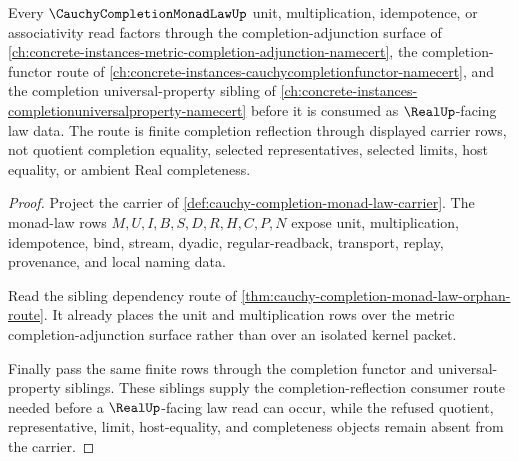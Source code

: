 \begin{theorem}
\label{thm:cauchy-completion-monad-law-completion-reflection-consumer-link}
Every $\CauchyCompletionMonadLawUp$ unit, multiplication, idempotence, or associativity read factors through the completion-adjunction surface of \autoref{ch:concrete-instances-metric-completion-adjunction-namecert}, the completion-functor route of \autoref{ch:concrete-instances-cauchycompletionfunctor-namecert}, and the completion universal-property sibling of \autoref{ch:concrete-instances-completionuniversalproperty-namecert} before it is consumed as $\RealUp$-facing law data. The route is finite completion reflection through displayed carrier rows, not quotient completion equality, selected representatives, selected limits, host equality, or ambient Real completeness.
\end{theorem}
\begin{proof}
Project the carrier of \autoref{def:cauchy-completion-monad-law-carrier}. The monad-law rows $M,U,I,B,S,D,R,H,C,P,N$ expose unit, multiplication, idempotence, bind, stream, dyadic, regular-readback, transport, replay, provenance, and local naming data.

Read the sibling dependency route of \autoref{thm:cauchy-completion-monad-law-orphan-route}. It already places the unit and multiplication rows over the metric completion-adjunction surface rather than over an isolated kernel packet.

Finally pass the same finite rows through the completion functor and universal-property siblings. These siblings supply the completion-reflection consumer route needed before a $\RealUp$-facing law read can occur, while the refused quotient, representative, limit, host-equality, and completeness objects remain absent from the carrier.
\end{proof}

